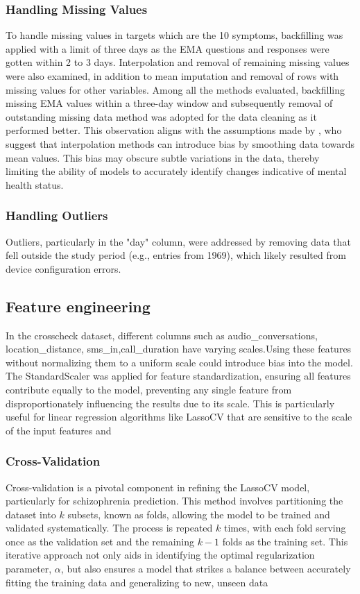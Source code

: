  \subsubsection{Handling Missing Values}
To handle missing values in targets which are the 10 symptoms, backfilling was applied with a limit of three days as the EMA questions and responses were gotten within 2 to 3 days. Interpolation and removal of remaining missing values were also examined, in addition to mean imputation and removal of rows with missing values for other variables. Among all the methods evaluated, backfilling missing EMA values within a three-day window and subsequently removal of outstanding missing data method was adopted for the data cleaning as it performed better. This observation aligns with the assumptions made by \citet{adler2020predicting}, who suggest that interpolation methods can introduce bias by smoothing data towards mean values. This bias may obscure subtle variations in the data, thereby limiting the ability of models to accurately identify changes indicative of mental health status.
\subsubsection{Handling Outliers}
Outliers, particularly in the "day" column, were addressed by removing data that fell outside the study period (e.g., entries from 1969), which likely resulted from device configuration errors.
\subsection{Feature engineering}
In the crosscheck dataset, different columns such as audio\_conversations, location\_distance, sms\_in,call\_duration have varying scales.Using these features without normalizing them to a uniform scale could introduce bias into the model. The StandardScaler was applied for feature standardization, ensuring all features contribute equally to the model, preventing any single feature from disproportionately influencing the results due to its scale. This is particularly useful for linear regression algorithms like LassoCV that are sensitive to the scale of the input features \citep{mayer1974procedures} and \citep{mathur2023generalized}

 \subsubsection{Cross-Validation}
Cross-validation is a pivotal component in refining the LassoCV model, particularly for schizophrenia prediction. This method involves partitioning the dataset into \( k \) subsets, known as folds, allowing the model to be trained and validated systematically. The process is repeated \( k \) times, with each fold serving once as the validation set and the remaining \( k-1 \) folds as the training set. This iterative approach not only aids in identifying the optimal regularization parameter, \(\alpha\), but also ensures a model that strikes a balance between accurately fitting the training data and generalizing to new, unseen data \citep{kolluri2020reducing}

